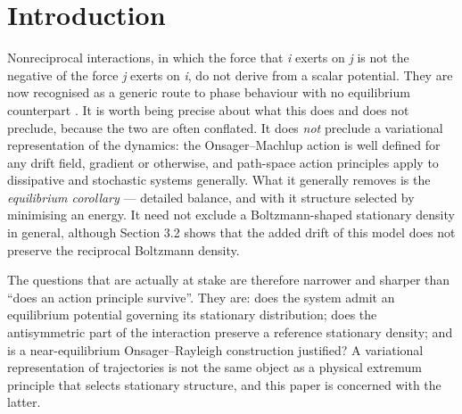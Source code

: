 \documentclass[aps,pre,preprint,superscriptaddress,nofootinbib,longbibliography]{revtex4-2}
\begin{document}
\begin{abstract}
Three auxiliary strands are reported more briefly. Of three commonly invoked near-equilibrium diagnostics, two fail for reasons concerning the instrument rather than the system; the third, measured on single-particle coordinates, gives a single effective temperature equal to the bath temperature over a drive-dependent short-lag window, shared by both species, with a shared and growing violation at longer lags. Comparisons with beating \emph{Chlamydomonas} axonemes, with a synthetic ensemble given an imposed turning rate, and with published social-dominance matrices bound how far the circulation result generalises --- in particular, the axoneme contrast cannot be read as biological, since the synthetic ensemble circulates more strongly still.
\end{abstract}


\maketitle

\section{Introduction}

Nonreciprocal interactions, in which the force that \emph{i} exerts on \emph{j} is not the negative of the force \emph{j} exerts on \emph{i}, do not derive from a scalar potential. They are now recognised as a generic route to phase behaviour with no equilibrium counterpart \cite{r2}. It is worth being precise about what this does and does not preclude, because the two are often conflated. It does \emph{not} preclude a variational representation of the dynamics: the Onsager--Machlup action is well defined for any drift field, gradient or otherwise, and path-space action principles apply to dissipative and stochastic systems generally. What it generally removes is the \emph{equilibrium corollary} --- detailed balance, and with it structure selected by minimising an energy. It need not exclude a Boltzmann-shaped stationary density in general, although Section 3.2 shows that the added drift of this model does not preserve the reciprocal Boltzmann density.

The questions that are actually at stake are therefore narrower and sharper than ``does an action principle survive''. They are: does the system admit an equilibrium potential governing its stationary distribution; does the antisymmetric part of the interaction preserve a reference stationary density; and is a near-equilibrium Onsager--Rayleigh construction justified? A variational representation of trajectories is not the same object as a physical extremum principle that selects stationary structure, and this paper is concerned with the latter.
\end{document}
